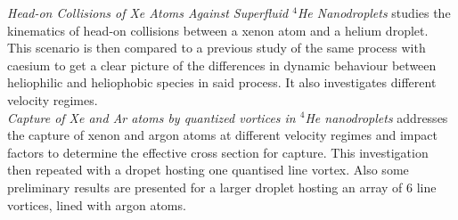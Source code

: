 \documentclass[11pt,a4paper,twoside]{article}
\begin{document}
			\emph{Head-on Collisions of Xe Atoms Against Superfluid $^4\!$He Nanodroplets} studies the kinematics of head-on collisions between a xenon atom and a helium droplet. This scenario is then compared to a previous study of the same process with caesium to get a clear picture of the differences in dynamic behaviour between heliophilic and heliophobic species in said process. It also investigates different velocity regimes.\\
		
			\emph{Capture of Xe and Ar atoms by quantized vortices in $^4\!$He nanodroplets} addresses the capture of xenon and argon atoms at different velocity regimes and impact factors to determine the effective cross section for capture. This investigation then repeated with a dropet hosting one quantised line vortex. Also some preliminary results are presented for a larger droplet hosting an array of 6 line vortices, lined with argon atoms.
			

\end{document}
